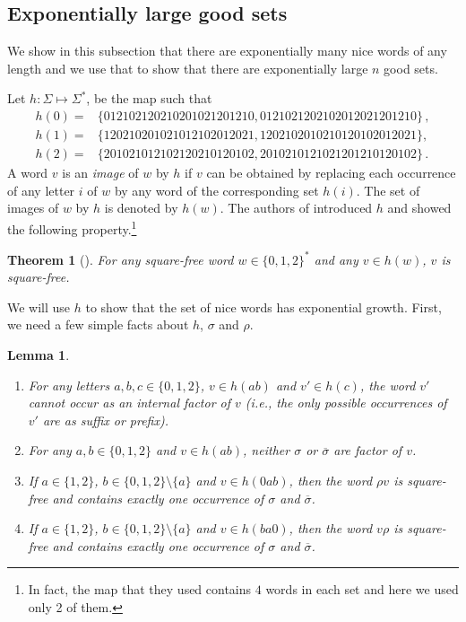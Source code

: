 \documentclass[a4paper,12pt]{article}
\newtheorem{theorem}{Theorem}
\newtheorem{lemma}{Lemma}
\newcommand{\pal}{\rho}
\newcommand{\hpal}{\sigma}
\begin{document}
\subsection{Exponentially large good sets}
We show in this subsection that there are exponentially many nice words of any length and we use that to show that there are exponentially large $n$ good sets.

Let $h:\Sigma\mapsto\Sigma^*$, be the map such that
\begin{align*}
h(0)=&\{
        012102120210201 021201210,
        0121021202102012021201210\}\,,\\
h(1)=& \{120210201021012102012021, 1202102010210120102012021\},\\
h(2)=& \{201021012102120210120102, 2010210121021201210120102\}\,.
\end{align*}
A word $v$ is an \emph{image} of $w$ by $h$ if $v$ can be obtained by replacing each occurrence of any letter $i$ of $w$ by any word of the corresponding set $h(i)$. The set of images of $w$ by $h$ is denoted by $h(w)$.
The authors of  \cite{nicesubstitution} introduced $h$ and showed the following property.\footnote{In fact, the map that they used contains $4$ words in each set and here we used only 2 of them.}
\begin{theorem}[{\cite[Theorem 20]{nicesubstitution}}]\label{sqfreesub}
For any square-free word $w\in\{0,1,2\}^*$ and any $v\in h(w)$,
$v$ is square-free.
\end{theorem}

We will use $h$ to show that the set of nice words has exponential growth.
First, we need  a few simple facts about $h$, $\hpal$ and $\pal$.

\begin{lemma}\label{observations}
 \begin{enumerate}
 \item For any letters $a,b,c\in\{0,1,2\}$, $v\in h(ab)$ and $v'\in h(c)$, the word $v'$ cannot occur as an internal factor of $v$ (i.e., the only possible occurrences of $v'$ are as suffix or prefix).
  \item For any $a,b\in\{0,1,2\}$  and $v\in h(ab)$,
 neither  $\hpal$ or $\overline{\hpal}$  are factor of $v$.
 \item If $a\in\{1,2\}$, $b\in \{0,1,2\}\setminus\{a\}$ and $v\in h(0ab)$, then the word $\pal v$ is square-free and contains exactly one occurrence of $\hpal$ and $\overline{\hpal}$.
 \item If $a\in\{1,2\}$, $b\in \{0,1,2\}\setminus\{a\}$ and $v\in h(ba0)$, then the word $v\pal$ is square-free and contains exactly one occurrence of $\hpal$ and $\overline{\hpal}$.
 \end{enumerate}
\end{lemma}
\end{document}
